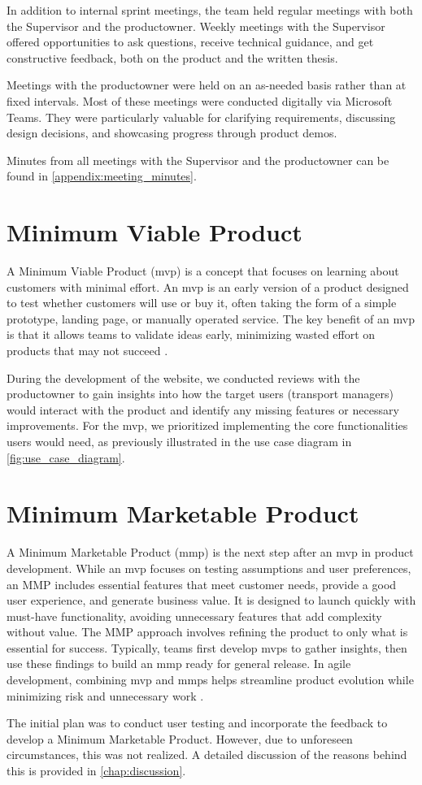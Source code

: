In addition to internal sprint meetings, the team held regular meetings with both the Supervisor and the \gls{productowner}. Weekly meetings with the Supervisor offered opportunities to ask questions, receive technical guidance, and get constructive feedback, both on the product and the written thesis.

Meetings with the \gls{productowner} were held on an as-needed basis rather than at fixed intervals. Most of these meetings were conducted digitally via Microsoft Teams. They were particularly valuable for clarifying requirements, discussing design decisions, and showcasing progress through product demos.

Minutes from all meetings with the Supervisor and the \gls{productowner} can be found in \autoref{appendix:meeting_minutes}.

\section{Minimum Viable Product}

A Minimum Viable Product (\acrshort{mvp}) is a concept that focuses on learning about customers with minimal effort. An \acrshort{mvp} is an early version of a product designed to test whether customers will use or buy it, often taking the form of a simple prototype, landing page, or manually operated service. The key benefit of an \acrshort{mvp} is that it allows teams to validate ideas early, minimizing wasted effort on products that may not succeed \cite{agile_alliance_mvp}. 

During the development of the website, we conducted reviews with the \gls{productowner} to gain insights into how the target users (transport managers) would interact with the product and identify any missing features or necessary improvements. For the \acrshort{mvp}, we prioritized implementing the core functionalities users would need, as previously illustrated in the use case diagram in \autoref{fig:use_case_diagram}.

\section{Minimum Marketable Product}

A Minimum Marketable Product (\acrshort{mmp}) is the next step after an \Gls{mvp} in product development. While an \acrshort{mvp} focuses on testing assumptions and user preferences, an MMP includes essential features that meet customer needs, provide a good user experience, and generate business value. It is designed to launch quickly with must-have functionality, avoiding unnecessary features that add complexity without value. The MMP approach involves refining the product to only what is essential for success. Typically, teams first develop \acrshort{mvp}s to gather insights, then use these findings to build an \acrshort{mmp} ready for general release. In agile development, combining \acrshort{mvp} and \acrshort{mmp}s helps streamline product evolution while minimizing risk and unnecessary work \cite{wanner_mmp}. 

The initial plan was to conduct user testing and incorporate the feedback to develop a Minimum Marketable Product. However, due to unforeseen circumstances, this was not realized. A detailed discussion of the reasons behind this is provided in \autoref{chap:discussion}.
